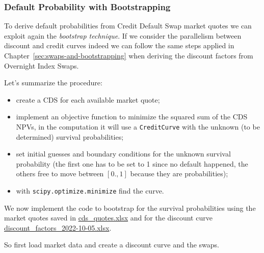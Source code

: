\subsubsection*{Default Probability with Bootstrapping}
\label{default-probabilities-and-cds}

To derive default probabilities from Credit Default Swap market quotes we can exploit again the \emph{bootstrap technique}. If we consider the parallelism between discount and credit curves indeed we can follow the same steps applied in Chapter~\ref{sec:swaps-and-bootstrapping} when deriving the discount factors from Overnight Index Swaps.

Let's summarize the procedure: 
\begin{itemize}
\tightlist
\item create a CDS for each available market quote;
\item implement an objective function to minimize the squared sum of the CDS NPVs, in the computation it will use a \texttt{CreditCurve} with the unknown (to be determined) survival probabilities;
\item set initial guesses and boundary conditions for the unknown survival probability (the first one has to be set to 1 since no default happened, the others free to move between $[0., 1]$ because they are probabilities);
\item with \texttt{scipy.optimize.minimize} find the curve.
\end{itemize}

We now implement the code to bootstrap for the survival probabilities using the market quotes saved in \href{https://github.com/matteosan1/finance_course/raw/master/input_files/cds_quotes.xlsx}{cds\_quotes.xlsx} and for the discount curve \href{https://github.com/matteosan1/finance_course/raw/master/input_files/discount_factors_2022-10-05.xlsx}{discount\_factors\_2022-10-05.xlsx}.

So first load market data and create a discount curve and the swaps.

